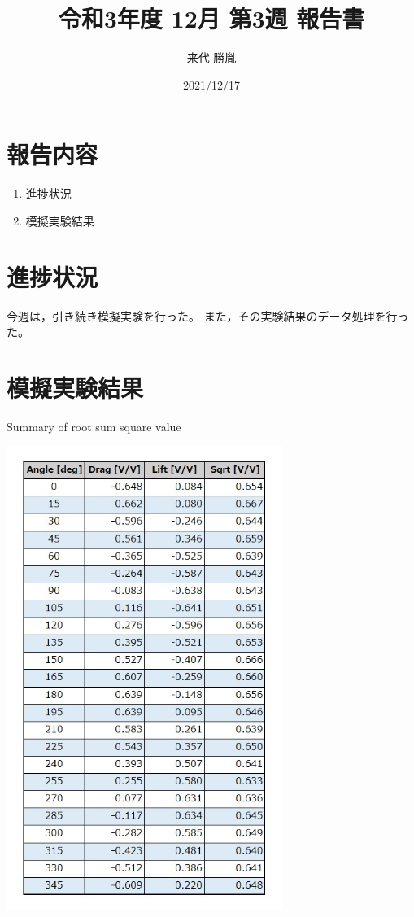 \documentclass[twocolumn,a4j]{jsarticle}
\author{来代 勝胤}
\title{令和3年度 12月 第3週 報告書}
\date{2021/12/17}
\begin{document}
\columnseprule=0.1mm

\maketitle
\section*{報告内容}
\begin{enumerate}[1.]
    \item 進捗状況
    \item 模擬実験結果
\end{enumerate}

\section{進捗状況}
今週は，引き続き模擬実験を行った。
また，その実験結果のデータ処理を行った。

\section{模擬実験結果}

\begin{table}[htbp]
    \begin{center}
        \caption{Summary of root sum square value}
        \includegraphics[width=90mm]{../images/table_1.jpg}
    \end{center}
\end{table}
\end{document}

